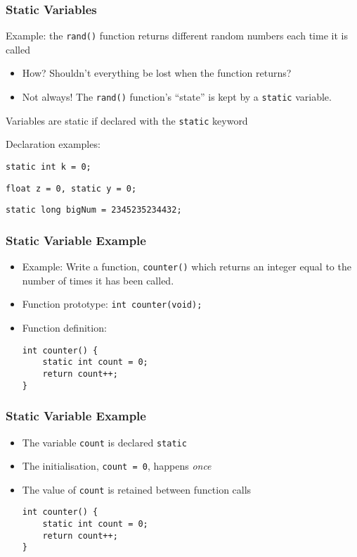 \documentclass[14pt]{beamer}
\begin{document}
\begin{frame}
\frametitle{Static Variables}
\begin{itemize}
\item Example: the \texttt{rand()} function returns different random numbers each time it is called
	\begin{itemize}
		\item How? Shouldn't everything be lost when the function returns?
		\item Not always! The \texttt{rand()} function's ``state'' is kept by a \texttt{static} variable.
	\end{itemize}
\pause
\item Variables are static if declared with the \texttt{static} keyword
\item Declaration examples:
\pause
{\small
\item \texttt{static int k = 0;}
\item \texttt{float z = 0, static y = 0;}
\item \texttt{static long bigNum = 2345235234432;}
}
\end{itemize}
\end{frame}

\begin{frame}[fragile]
\frametitle{Static Variable Example}
\begin{itemize}
\item Example: Write a function, \texttt{counter()} which returns an integer equal to the number of times it has been called.
\pause
\item Function prototype: \texttt{int counter(void);}
\pause
\item Function definition:
\begin{lstlisting}[style=CStyle]
int counter() {
	static int count = 0;
	return count++;
}
\end{lstlisting}
\end{itemize}
\end{frame}

\begin{frame}[fragile]
\frametitle{Static Variable Example}
\begin{itemize}
\item The variable \texttt{count} is declared \texttt{static}
\item The initialisation, \texttt{count = 0}, happens \textit{once}
\item The value of \texttt{count} is retained between function calls 
\begin{lstlisting}[style=CStyle]
int counter() {
	static int count = 0;
	return count++;
}
\end{lstlisting}
\end{itemize}
\end{frame}
\end{document}

